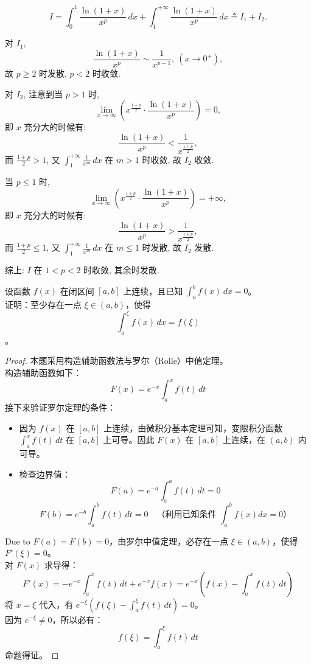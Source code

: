 \documentclass[lang=cn,12pt]{elegantbook}
\begin{document}
\begin{solution}
    \[
    I = \int_{0}^{1} \frac{\ln(1+x)}{x^p} \, dx + \int_{1}^{+\infty} \frac{\ln(1+x)}{x^p} \, dx \triangleq I_1 + I_2.
    \]

    对 $I_1$, 
    \[
    \frac{\ln(1+x)}{x^p} \sim \frac{1}{x^{p-1}},\ (x \to 0^+),
    \]
    故 $p \ge 2$ 时发散, $p < 2$ 时收敛.

    对 $I_2$, 注意到当 $p > 1$ 时,
    \[
    \lim_{x \to \infty} \left( x^{\frac{1+p}{2}} \cdot \frac{\ln(1+x)}{x^p} \right) = 0,
    \]
    即 $x$ 充分大的时候有:
    \[
    \frac{\ln(1+x)}{x^p} < \frac{1}{x^{\frac{1+p}{2}}},
    \]
    而 $\frac{1+p}{2} > 1$, 又 $\displaystyle \int_{1}^{+\infty} \frac{1}{x^m} \, dx$ 在 $m>1$ 时收敛, 故 $I_2$ 收敛.

    当 $p \le 1$ 时,
    \[
    \lim_{x \to \infty} \left( x^{\frac{1+p}{2}} \cdot \frac{\ln(1+x)}{x^p} \right) = +\infty,
    \]
    即 $x$ 充分大的时候有:
    \[
    \frac{\ln(1+x)}{x^p} > \frac{1}{x^{\frac{1+p}{2}}},
    \]
    而 $\frac{1+p}{2} \le 1$, 又 $\displaystyle \int_{1}^{+\infty} \frac{1}{x^m} \, dx$ 在 $m \le 1$ 时发散, 故 $I_2$ 发散.

    综上: $I$ 在 $1 < p < 2$ 时收敛, 其余时发散.
\end{solution}

\vspace{1em}

\begin{example}
设函数 $f(x)$ 在闭区间 $[a, b]$ 上连续，且已知 $\int_a^b f(x) \, dx = 0$。\\
证明：至少存在一点 $\xi \in (a, b)$，使得 $$\int_a^\xi f(x) \, dx = f(\xi)$$。
\end{example}

\begin{proof}
    本题采用构造辅助函数法与罗尔（Rolle）中值定理。 \\
    构造辅助函数如下：
    \[ F(x) = e^{-x} \int_a^x f(t) \, dt \]
    接下来验证罗尔定理的条件：
    \begin{itemize}
        \item[1)] 因为 $f(x)$ 在 $[a, b]$ 上连续，由微积分基本定理可知，变限积分函数 $\int_a^x f(t) \, dt$ 在 $[a, b]$ 上可导。因此 $F(x)$ 在 $[a, b]$ 上连续，在 $(a, b)$ 内可导。
        \item[2)] 检查边界值：
        \[ F(a) = e^{-a} \int_a^a f(t) \, dt = 0 \]
        \[ F(b) = e^{-b} \int_a^b f(t) \, dt = 0 \quad \text{（利用已知条件 $\int_a^b f(x)dx=0$）} \]
    \end{itemize}
    Due to $F(a) = F(b) = 0$，由罗尔中值定理，必存在一点 $\xi \in (a, b)$，使得 $F'(\xi) = 0$。 \\
    对 $F(x)$ 求导得：
    \[ F'(x) = -e^{-x} \int_a^x f(t) \, dt + e^{-x} f(x) = e^{-x} \left( f(x) - \int_a^x f(t) \, dt \right) \]
    将 $x = \xi$ 代入，有 $e^{-\xi} \left( f(\xi) - \int_a^\xi f(t) \, dt \right) = 0$。 \\
    因为 $e^{-\xi} \neq 0$，所以必有：
    \[ f(\xi) = \int_a^\xi f(t) \, dt \]
    命题得证。
\end{proof}
\end{document}
